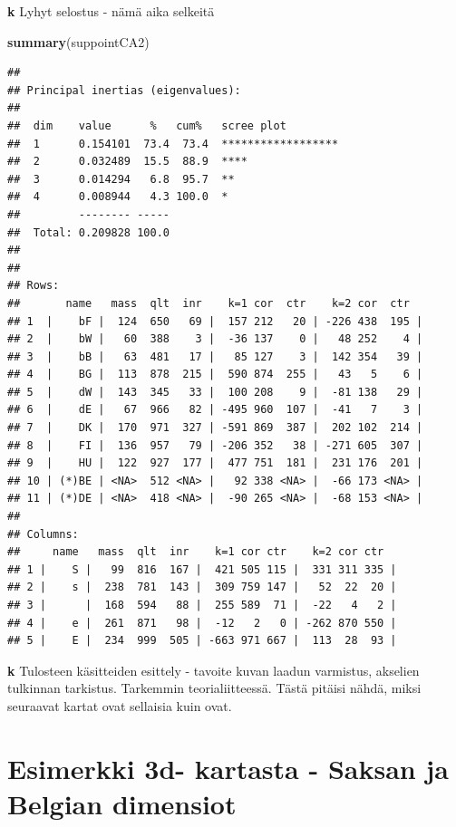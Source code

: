 \documentclass[
  finnish,
]{book}
\newenvironment{Shaded}{\begin{snugshade}}{\end{snugshade}}
\newcommand{\KeywordTok}[1]{\textcolor[rgb]{0.13,0.29,0.53}{\textbf{#1}}}
\newcommand{\NormalTok}[1]{#1}
\begin{document}
\textbf{k} Lyhyt selostus - nämä aika selkeitä

\begin{Shaded}
\begin{Highlighting}[]
\KeywordTok{summary}\NormalTok{(suppointCA2)}
\end{Highlighting}
\end{Shaded}

\begin{verbatim}
## 
## Principal inertias (eigenvalues):
## 
##  dim    value      %   cum%   scree plot               
##  1      0.154101  73.4  73.4  ******************       
##  2      0.032489  15.5  88.9  ****                     
##  3      0.014294   6.8  95.7  **                       
##  4      0.008944   4.3 100.0  *                        
##         -------- -----                                 
##  Total: 0.209828 100.0                                 
## 
## 
## Rows:
##       name   mass  qlt  inr    k=1 cor  ctr    k=2 cor  ctr  
## 1  |    bF |  124  650   69 |  157 212   20 | -226 438  195 |
## 2  |    bW |   60  388    3 |  -36 137    0 |   48 252    4 |
## 3  |    bB |   63  481   17 |   85 127    3 |  142 354   39 |
## 4  |    BG |  113  878  215 |  590 874  255 |   43   5    6 |
## 5  |    dW |  143  345   33 |  100 208    9 |  -81 138   29 |
## 6  |    dE |   67  966   82 | -495 960  107 |  -41   7    3 |
## 7  |    DK |  170  971  327 | -591 869  387 |  202 102  214 |
## 8  |    FI |  136  957   79 | -206 352   38 | -271 605  307 |
## 9  |    HU |  122  927  177 |  477 751  181 |  231 176  201 |
## 10 | (*)BE | <NA>  512 <NA> |   92 338 <NA> |  -66 173 <NA> |
## 11 | (*)DE | <NA>  418 <NA> |  -90 265 <NA> |  -68 153 <NA> |
## 
## Columns:
##     name   mass  qlt  inr    k=1 cor ctr    k=2 cor ctr  
## 1 |    S |   99  816  167 |  421 505 115 |  331 311 335 |
## 2 |    s |  238  781  143 |  309 759 147 |   52  22  20 |
## 3 |      |  168  594   88 |  255 589  71 |  -22   4   2 |
## 4 |    e |  261  871   98 |  -12   2   0 | -262 870 550 |
## 5 |    E |  234  999  505 | -663 971 667 |  113  28  93 |
\end{verbatim}

\textbf{k} Tulosteen käsitteiden esittely - tavoite kuvan laadun
varmistus, akselien tulkinnan tarkistus. Tarkemmin teorialiitteessä.
Tästä pitäisi nähdä, miksi seuraavat kartat ovat sellaisia kuin ovat.

\hypertarget{esimerkki-3d--kartasta---saksan-ja-belgian-dimensiot}{%
\section{Esimerkki 3d- kartasta - Saksan ja Belgian
dimensiot}\label{esimerkki-3d--kartasta---saksan-ja-belgian-dimensiot}}
\end{document}
